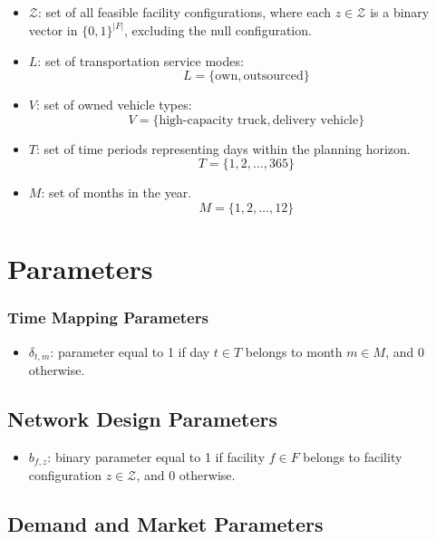 \documentclass[12pt]{article}
\begin{document}
\begin{itemize}
    \item $\mathcal{Z}$: set of all feasible facility configurations, where each $z \in \mathcal{Z}$ is a binary vector in $\{0,1\}^{|F|}$, excluding the null configuration.

    \item $L$: set of transportation service modes:
    \[
    L = \{\text{own}, \text{outsourced}\}
    \]

    \item $V$: set of owned vehicle types:
    \[
    V = \{\text{high-capacity truck}, \text{delivery vehicle}\}
    \]

    \item $T$: set of time periods representing days within the planning horizon.
    \[
    T = \{1,2,\dots,365\}
    \]

    \item $M$: set of months in the year.
    \[
    M = \{1,2,\dots,12\}
    \]

\end{itemize}
\newpage

\section{Parameters}

\subsubsection{Time Mapping Parameters}
\begin{itemize}
    \item $\delta_{t,m}$: parameter equal to 1 if day $t \in T$ belongs to month $m \in M$, and 0 otherwise.
\end{itemize}

\subsection{Network Design Parameters}

\begin{itemize}
    \item $b_{f,z}$: binary parameter equal to 1 if facility $f \in F$ belongs to facility configuration $z \in \mathcal{Z}$, and 0 otherwise.
\end{itemize}

\subsection{Demand and Market Parameters}
\end{document}
